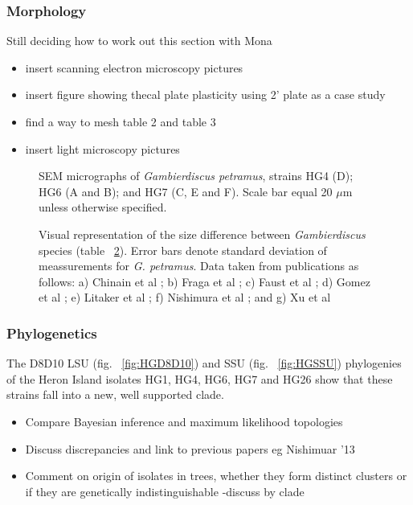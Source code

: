 \documentclass[12pt]{article}
\begin{document}
\subsubsection{Morphology}
Still deciding how to work out this section with Mona
\begin{itemize}
\item insert scanning electron microscopy pictures
\item insert figure showing thecal plate plasticity using 2' plate as a case study
\item find a way to mesh table 2 and table 3
\item insert light microscopy pictures
\end{itemize}

\FloatBarrier 
\begin{figure} 
\caption{SEM micrographs of \emph{Gambierdiscus petramus}, strains HG4 (D); HG6 (A and B); and HG7 (C, E and F). Scale bar equal 20 $\mu$m unless otherwise specified.} 
\label{fig:PetSEM}
\end{figure} 
\FloatBarrier 


\FloatBarrier 
\begin{figure} 
\caption{Visual representation of the size difference between \emph{Gambierdiscus} species (table ~\ref{fig:SizeGraph}). Error bars denote standard deviation of meassurements for \emph{G. petramus}. Data taken from publications as follows: a) Chinain et al \cite{chinain1999morphology}; b) Fraga et al \cite{fraga2014genus}; c) Faust et al \cite{faust1995observation}; d) Gomez et al \cite{gomez2015fukuyoa}; e) Litaker et al \cite{litaker2009taxonomy}; f) Nishimura et al \cite{nishimura2014morphology}; and g) Xu et al \cite{xu2014distribution}} 
\label{fig:SizeGraph}
\end{figure} 
\FloatBarrier 

\subsubsection{Phylogenetics}

The D8D10 LSU (fig. ~\ref{fig:HGD8D10}) and SSU (fig. ~\ref{fig:HGSSU}) phylogenies of the Heron Island isolates HG1, HG4, HG6, HG7 and HG26 show that these strains fall into a new, well supported clade.\\
\begin{itemize}
\item Compare Bayesian inference and maximum likelihood topologies
\item Discuss discrepancies and link to previous papers eg Nishimuar '13
\item Comment on origin of isolates in trees, whether they form distinct clusters or if they are genetically indistinguishable
-discuss by clade
\end{itemize}
\FloatBarrier 
\end{document}
